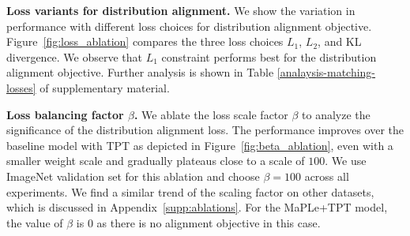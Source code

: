 \documentclass[a4paper]{article}
\begin{document}





\textbf{Loss variants for distribution alignment.} We show the variation in performance with different loss choices for distribution alignment objective. Figure~\ref{fig:loss_ablation} compares the three loss choices $L_1$, $L_2$, and KL divergence. We observe that $L_1$ constraint performs best for the distribution alignment objective. Further analysis is shown in Table \ref{analaysis-matching-losses} of supplementary material.

\textbf{Loss balancing factor $\beta$.}
We ablate the loss scale factor $\beta$ to analyze the significance of the distribution alignment loss. The performance improves over the baseline model with TPT as depicted in Figure~\ref{fig:beta_ablation}, even with a smaller weight scale and gradually plateaus close to a scale of $100$. We use ImageNet validation set for this ablation and choose $\beta = 100$ across all experiments. We find a similar trend of the scaling factor on other datasets, which is discussed in Appendix~\ref{supp:ablations}. For the MaPLe+TPT model, the value of $\beta$ is 0 as there is no alignment objective in this case.
\end{document}
